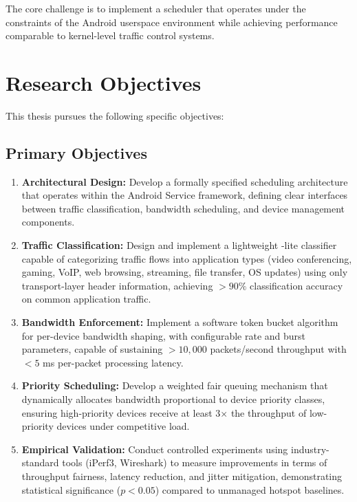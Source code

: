 The core challenge is to implement a \qos scheduler that operates under the constraints of the Android userspace environment while achieving performance comparable to kernel-level traffic control systems.

\section{Research Objectives}
\label{sec:objectives}

This thesis pursues the following specific objectives:

\subsection{Primary Objectives}

\begin{enumerate}[label=\textbf{O\arabic*:},leftmargin=*]
    \item \textbf{Architectural Design:} Develop a formally specified \qos scheduling architecture that operates within the Android \vpn Service framework, defining clear interfaces between traffic classification, bandwidth scheduling, and device management components.
    
    \item \textbf{Traffic Classification:} Design and implement a lightweight \dpi-lite classifier capable of categorizing traffic flows into application types (video conferencing, gaming, VoIP, web browsing, streaming, file transfer, OS updates) using only transport-layer header information, achieving $>90\%$ classification accuracy on common application traffic.
    
    \item \textbf{Bandwidth Enforcement:} Implement a software token bucket algorithm for per-device bandwidth shaping, with configurable rate and burst parameters, capable of sustaining $>10,000$ packets/second throughput with $<5$ ms per-packet processing latency.
    
    \item \textbf{Priority Scheduling:} Develop a weighted fair queuing mechanism that dynamically allocates bandwidth proportional to device priority classes, ensuring high-priority devices receive at least 3× the throughput of low-priority devices under competitive load.
    
    \item \textbf{Empirical Validation:} Conduct controlled experiments using industry-standard tools (iPerf3, Wireshark) to measure \qos improvements in terms of throughput fairness, latency reduction, and jitter mitigation, demonstrating statistical significance ($p < 0.05$) compared to unmanaged hotspot baselines.
\end{enumerate}

